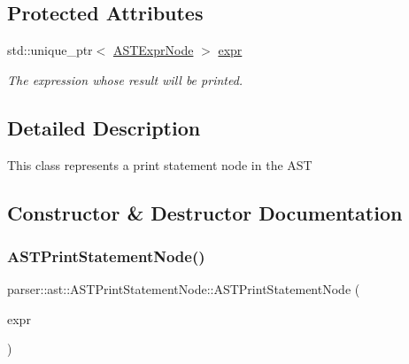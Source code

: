 \subsection*{Protected Attributes}
\begin{DoxyCompactItemize}
\item 
\mbox{\label{classparser_1_1ast_1_1ASTPrintStatementNode_a6e7ab83be122fb4f6428b5222faf7169}} 
std\+::unique\+\_\+ptr$<$ \hyperlink{classparser_1_1ast_1_1ASTExprNode}{A\+S\+T\+Expr\+Node} $>$ \hyperlink{classparser_1_1ast_1_1ASTPrintStatementNode_a6e7ab83be122fb4f6428b5222faf7169}{expr}
\begin{DoxyCompactList}\small\item\em The expression whose result will be printed. \end{DoxyCompactList}\end{DoxyCompactItemize}


\subsection{Detailed Description}
This class represents a print statement node in the A\+ST 

\subsection{Constructor \& Destructor Documentation}
\mbox{\label{classparser_1_1ast_1_1ASTPrintStatementNode_a078c63cee6196eb39232a1004614f2f2}} 
\subsubsection{\texorpdfstring{A\+S\+T\+Print\+Statement\+Node()}{ASTPrintStatementNode()}}
{\footnotesize\ttfamily parser\+::ast\+::\+A\+S\+T\+Print\+Statement\+Node\+::\+A\+S\+T\+Print\+Statement\+Node (\begin{DoxyParamCaption}\item[{std\+::unique\+\_\+ptr$<$ \hyperlink{classparser_1_1ast_1_1ASTExprNode}{A\+S\+T\+Expr\+Node} $>$}]{expr }\end{DoxyParamCaption})}

